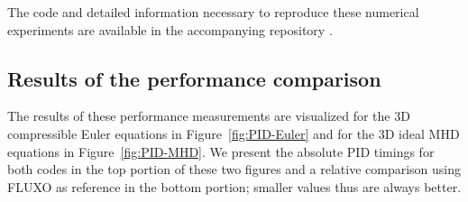 \documentclass[hidelinks]{juliacon} %
\begin{document}
The code and detailed information necessary to reproduce these numerical
experiments are available in the accompanying repository \cite{ranocha2021adaptiveRepro}.

\subsection{Results of the performance comparison}

The results of these performance measurements are visualized for the 3D compressible Euler equations
in Figure~\ref{fig:PID-Euler} and for the 3D ideal MHD equations in Figure~\ref{fig:PID-MHD}.
We present the absolute PID timings for both codes in the top portion of these two figures and
a relative comparison using FLUXO as reference in the bottom portion; smaller values thus are always
better.
\end{document}
